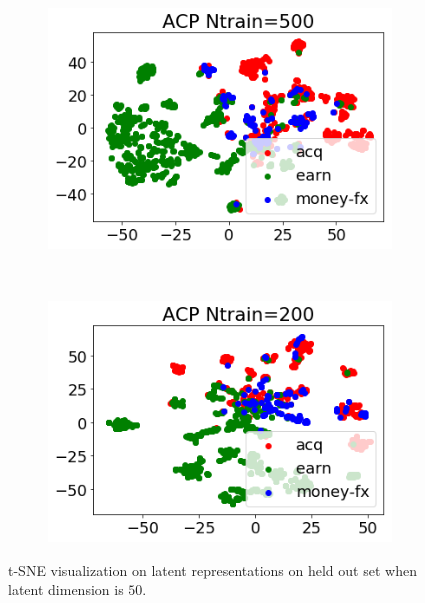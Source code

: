 \documentclass[twoside]{article}
\begin{document}
\begin{figure}
\begin{subfigure}[t]{0.33\textwidth}
        \includegraphics[width=1.0\linewidth]{reuters_acp500_h50.png}
        \label{fig: reuters_h50_acp_500}
    \end{subfigure}%
    ~
    \begin{subfigure}[t]{0.33\textwidth}
        \centering
        \includegraphics[width=1.0\linewidth]{reuters_acp200_h50.png}
        \label{fig: reuters_h50_acp_200}
    \end{subfigure}%
\caption{\small t-SNE visualization on latent representations on held out set when latent dimension is $50$.}
\label{fig: reuters_hvis_50}
\end{figure}
\end{document}
